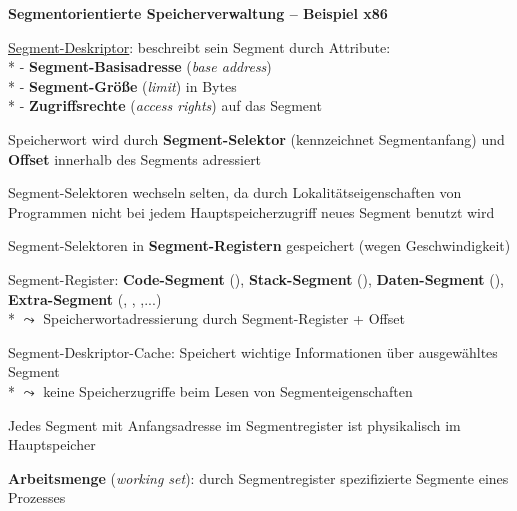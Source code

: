 \textbf{Segmentorientierte Speicherverwaltung -- Beispiel x86}
\begin{items}
  \item \underline{Segment-Deskriptor}: beschreibt sein Segment durch Attribute: \\*
    - \textbf{Segment-Basisadresse} (\emph{base address}) \\*
    - \textbf{Segment-Größe} (\emph{limit}) in Bytes \\*
    - \textbf{Zugriffsrechte} (\emph{access rights}) auf das Segment
  \item Speicherwort wird durch \textbf{Segment-Selektor} (kennzeichnet Segmentanfang) und \textbf{Offset} innerhalb des Segments adressiert
  \item Segment-Selektoren wechseln selten, da durch Lokalitätseigenschaften von Programmen nicht bei jedem Hauptspeicherzugriff neues Segment benutzt wird
  \item Segment-Selektoren in \textbf{Segment-Registern} gespeichert (wegen Geschwindigkeit)
  \item Segment-Register: \textbf{Code-Segment} (), \textbf{Stack-Segment} (), \textbf{Daten-Segment} (), \textbf{Extra-Segment} (, , ,...) \\*
    \( \leadsto \) Speicherwortadressierung durch Segment-Register + Offset
  \item Segment-Deskriptor-Cache: Speichert wichtige Informationen über ausgewähltes Segment \\*
    \( \leadsto \) keine Speicherzugriffe beim Lesen von Segmenteigenschaften
  \item Jedes Segment mit Anfangsadresse im Segmentregister ist physikalisch im Hauptspeicher
  \item \textbf{Arbeitsmenge} (\emph{working set}): durch Segmentregister spezifizierte Segmente eines Prozesses
\end{items}

